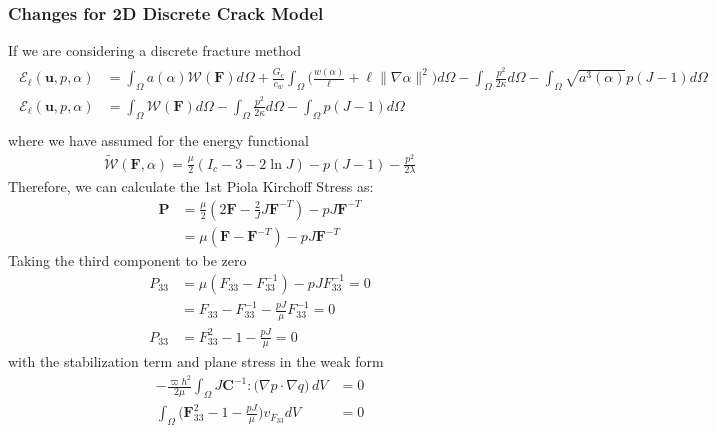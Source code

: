 \documentclass[12pt,3p]{article}
\numberwithin{equation}{section}
\begin{document}
\subsubsection{Changes for 2D Discrete Crack Model}
If we are considering a discrete fracture method
\begin{align*}
\begin{split}
\mathcal{E}_{\ell}\left(\boldsymbol{u}, p, \alpha\right) &= \int_{\Omega} a(\alpha) \mathcal{W}(\mathbf{F}) d \Omega + \frac{G_{c}}{c_{w}} \int_{\Omega} \bigg(\frac{w(\alpha)}{\ell} + \ell\|\nabla \alpha\|^{2} \bigg) d \Omega- \int_{\Omega} \frac{p^{2}}{2 \kappa} d \Omega - \int_{\Omega} \sqrt{a^{3}(\alpha)} p(J-1) d \Omega \\
\mathcal{E}_{\ell}\left(\boldsymbol{u}, p, \alpha\right) &= \int_{\Omega} \mathcal{W}(\mathbf{F}) d \Omega - \int_{\Omega} \frac{p^{2}}{2 \kappa} d \Omega - \int_{\Omega} p(J-1) d \Omega \\
\end{split}
\end{align*}
where we have assumed for the energy functional 
\begin{align*}
\widetilde{\mathcal{W}} (\mathbf{F}, \alpha) = \frac{\mu}{2} (I_c - 3 - 2 \ln J) - p (J-1) - \frac{p^2}{2 \lambda}
\end{align*}
Therefore, we can calculate the 1st Piola Kirchoff Stress as:
\begin{align*}
\mathbf{P} &= \frac{\mu}{2} (2 \mathbf{F} - \frac{2}{J} J \mathbf{F}^{-T}) - p J \mathbf{F}^{-T} \\
		&= \mu (\mathbf{F} - \mathbf{F}^{-T}) - p J \mathbf{F}^{-T}
\end{align*}
Taking the third component to be zero
\begin{align*}
P_{33} &=  \mu (F_{33} - F_{33}^{-1}) - p J F_{33}^{-1} = 0 \\
		&= F_{33} - F_{33}^{-1} - \frac{p J}{\mu} F_{33}^{-1} = 0 \\
P_{33} &= F_{33}^2 - 1 - \frac{p J}{\mu} = 0
\end{align*}
with the stabilization term and plane stress in the weak form 
\begin{align*}
- \frac{\varpi h^2}{2\mu} \int_{\Omega} J \mathbf{C}^{-1} : \big( \nabla p \cdot \nabla q \big) \,dV &= 0 \\
\int_{\Omega} \bigg( \mathbf{F}_{33}^2 - 1 - \frac{p J}{\mu} \bigg) v_{F_{33}} dV &= 0
\end{align*}

\end{document}
